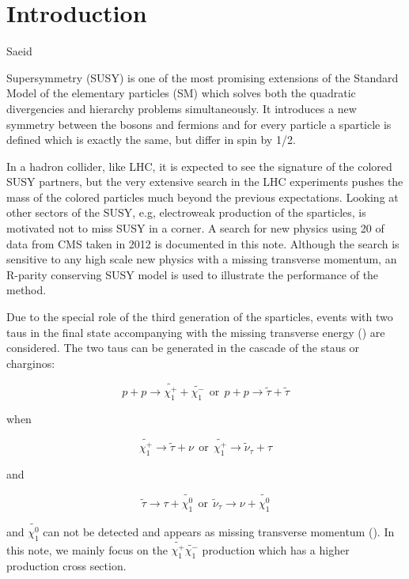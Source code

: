 \section{Introduction}
\label{sect:introduction}

Saeid

Supersymmetry \cite{Martin:1997ns} (SUSY) is one of the most promising extensions of the 
Standard Model of the elementary particles (SM) which solves both the 
quadratic divergencies and hierarchy problems simultaneously. It introduces a new symmetry between the bosons and fermions and 
for every particle a sparticle is defined which is exactly the same, but differ in spin by 1/2. 

In a hadron collider, like LHC, it is expected to see the signature of the colored SUSY partners, 
but the very extensive search in the LHC experiments pushes the mass of the colored particles much 
beyond the previous expectations. 
Looking at other sectors of the SUSY, e.g, electroweak production of the sparticles, is motivated not to miss SUSY in a corner.
A search for new physics using 20 \invfb of data from CMS taken in 2012 is documented in this note. 
Although the search is sensitive to any high scale 
new physics with a missing transverse momentum, an R-parity conserving SUSY model is used 
to illustrate the performance of the method.

Due to the special role of the third generation of the sparticles, events with two taus in the final state 
accompanying with the missing transverse energy (\met) are considered.
The two taus can be generated in the cascade of the staus or charginos:
\begin{linenomath}
\begin{equation}
p + p \rightarrow \tilde{\chi_{1}^{+}} + \tilde{\chi_{1}^{-}} ~~\mathrm{or}~~  p + p \rightarrow \tilde{\tau} + \tilde{\tau}
\end{equation}
\end{linenomath}
when 
\begin{linenomath}
\begin{equation}
\tilde{\chi_{1}^{+}} \rightarrow \tilde{\tau} + \nu ~~\mathrm{or}~~  \tilde{\chi_{1}^{+}} \rightarrow \tilde{\nu}_{\tau} + \tau 
\end{equation}
\end{linenomath}
and 
\begin{linenomath}
\begin{equation}
\tilde{\tau} \rightarrow \tau + \tilde{\chi_{1}^{0}} ~~\mathrm{or}~~  \tilde{\nu}_{\tau} \rightarrow \nu + \tilde{\chi_{1}^{0}} 
\end{equation}
\end{linenomath}
and $\tilde{\chi_{1}^{0}}$ can not be detected and appears as missing transverse momentum (\met).
In this note, we mainly focus on the $\tilde{\chi_{1}^{+}}\tilde{\chi_{1}^{-}}$ production which has a higher 
production cross section.

